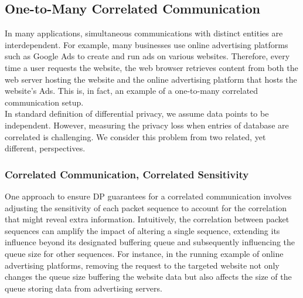 \subsection{One-to-Many Correlated Communication}
In many applications,  simultaneous communications with distinct entities are interdependent.
For example, many businesses use online advertising platforms such as Google Ads to create and run ads on various websites.
Therefore, every time a user requests the website, the web browser retrieves content from both the web server hosting the website and the online advertising platform that hosts the website's Ads.   
This is, in fact, an example of a one-to-many correlated communication setup.
\\
In standard definition of differential privacy, we assume data points to be independent.  
However, measuring the privacy loss when entries of database are correlated is challenging.
We consider this problem from two related, yet different, perspectives. 



\subsubsection{Correlated Communication, Correlated Sensitivity}
One approach to ensure DP guarantees for a correlated communication involves adjusting the sensitivity of each packet sequence to account for the correlation that might reveal extra information.
Intuitively, the correlation between packet sequences can amplify the impact of altering a single sequence, extending its influence beyond its designated buffering queue and subsequently influencing the queue size for other sequences.
For instance, in the running example of online advertising platforms, removing the request to the targeted website not only changes the queue size buffering the website data but also affects the size of the queue storing data from advertising servers.

